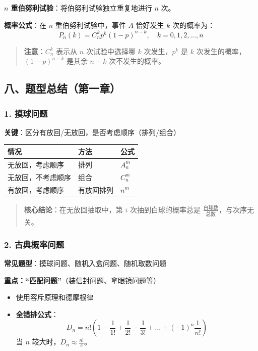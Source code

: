 \documentclass[12pt,a4paper]{ctexart}
\newenvironment{myquote}
  {\par\vspace{0.5em}\begin{quote}\sffamily\color{gray}}
  {\end{quote}\vspace{0.5em}}
\begin{document}
\textbf{$n$ 重伯努利试验}：将伯努利试验独立重复地进行 $n$ 次。

\textbf{概率公式}：在 $n$ 重伯努利试验中，事件 $A$ 恰好发生 $k$ 次的概率为：
\[
    P_n(k) = C_n^k p^k (1-p)^{n-k}, \quad k = 0,1,2,\dots,n
\]

\begin{myquote}
    \textbf{注意}：$C_n^k$ 表示从 $n$ 次试验中选择哪 $k$ 次发生，$p^k$ 是 $k$ 次发生的概率，$(1-p)^{n-k}$ 是其余 $n-k$ 次不发生的概率。
\end{myquote}

\subsection{八、题型总结（第一章）}

\subsubsection{1. 摸球问题}
\textbf{关键}：区分有放回/无放回，是否考虑顺序（排列/组合）

\begin{center}
    \begin{tabular}{@{}lll@{}}
        \toprule
        \textbf{情况} & \textbf{方法} & \textbf{公式} \\
        \midrule
        无放回，考虑顺序    & 排列          & $A_n^m$     \\
        无放回，不考虑顺序   & 组合          & $C_n^m$     \\
        有放回，考虑顺序    & 有放回排列       & $n^m$       \\
        \bottomrule
    \end{tabular}
\end{center}

\begin{myquote}
    \textbf{核心结论}：在无放回抽取中，第 $i$ 次抽到白球的概率总是 $\frac{\text{白球数}}{\text{总数}}$，与次序无关。
\end{myquote}

\subsubsection{2. 古典概率问题}
\textbf{常见题型}：摸球问题、随机入盒问题、随机取数问题

\textbf{重点：“匹配问题”}（装信封问题、拿眼镜问题等）
\begin{itemize}[noitemsep]
    \item 使用容斥原理和德摩根律
    \item \textbf{全错排公式}：
          \[
              D_n = n! \left(1 - \frac{1}{1!} + \frac{1}{2!} - \frac{1}{3!} + \dots + (-1)^n \frac{1}{n!}\right)
          \]
          当 $n$ 较大时，$D_n \approx \frac{n!}{e}$。
\end{itemize}
\end{document}
